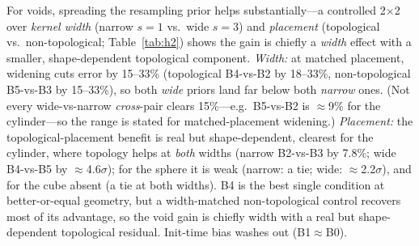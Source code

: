 For voids, spreading the resampling prior helps substantially---a controlled 2$\times$2
over \emph{kernel width} (narrow $s{=}1$ vs.\ wide $s{=}3$) and \emph{placement}
(topological vs.\ non-topological; Table~\ref{tab:h2}) shows the gain is chiefly a
\emph{width} effect with a smaller, shape-dependent topological component.
\emph{Width:} at matched placement, widening cuts error by 15--33\% (topological
B4-vs-B2 by 18--33\%, non-topological B5-vs-B3 by 15--33\%), so both \emph{wide} priors
land far below both \emph{narrow} ones. (Not every wide-vs-narrow \emph{cross}-pair
clears 15\%---e.g.\ B5-vs-B2 is $\approx$9\% for the cylinder---so the range is stated
for matched-placement widening.) \emph{Placement:} the topological-placement benefit is
real but shape-dependent, clearest for the cylinder, where topology helps at
\emph{both} widths (narrow B2-vs-B3 by 7.8\%; wide B4-vs-B5 by $\approx$4.6$\sigma$);
for the sphere it is weak (narrow: a tie; wide: $\approx$2.2$\sigma$), and for the cube
absent (a tie at both widths). B4 is the best single condition at better-or-equal
geometry, but a width-matched non-topological control recovers most of its advantage,
so the void gain is chiefly width with a real but shape-dependent topological residual.
Init-time bias washes out (B1${\approx}$B0).

\begin{table}[h]
\centering
{}
\caption{Voids, one paired-seed run ($N{=}1200$, 5 seeds): bottleneck-to-target
(decisive dim, tail mean; lower better) in a width$\times$placement 2$\times$2.
At matched placement, \emph{widening} cuts error by 15--33\% (B4-vs-B2, B5-vs-B3);
\emph{placement} is a smaller, shape-dependent residual---the topological column beats
the non-topological one clearly for the cylinder (both widths), weakly for the sphere
(wide only), and not for the cube. $B0$ is the baseline; $B1{\approx}B0$ (init washout,
omitted).}
\label{tab:h2}
\end{table}

